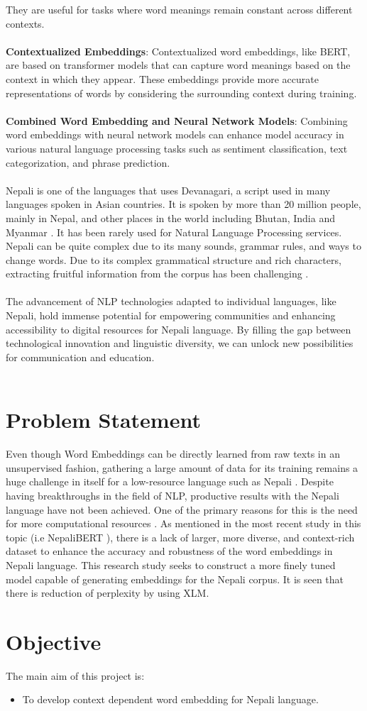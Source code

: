        They are useful for tasks where word meanings remain constant across different contexts.\\\\
        \textbf{Contextualized Embeddings}:
        Contextualized word embeddings, like BERT, are based on transformer models that can capture word meanings based on the context in which they appear.
        These embeddings provide more accurate representations of words by considering the surrounding context during training. \\\\
        \textbf{Combined Word Embedding and Neural Network Models}:
        Combining word embeddings with neural network models can enhance model accuracy in various natural language processing tasks such as sentiment classification, text categorization, and phrase prediction. \\\\
        Nepali is one of the languages that uses Devanagari, a script used in many languages spoken in Asian countries. It is spoken by more than 20 million people, mainly in Nepal, and other places in the world including Bhutan, India and Myanmar \cite{niraula2020linguistic}.  It has been rarely used for Natural Language Processing services.  Nepali can be quite complex due to its many sounds, grammar rules, and ways to change words. Due to its complex grammatical structure and rich characters, extracting fruitful information from the corpus has been challenging \cite{NepaliBERT}.\\\\
        The advancement of NLP technologies adapted to individual languages, like Nepali, hold immense potential for empowering communities and enhancing accessibility to digital resources for Nepali language. By filling the gap between technological innovation and linguistic diversity, we can unlock new possibilities for communication and education.\\\\
        \section{Problem Statement} 
        Even though Word Embeddings can be directly learned from raw texts in an unsupervised fashion, gathering a large amount of data for its training remains a huge challenge in itself for a low-resource language such as Nepali \cite{koirala-niraula-2021-npvec1}. Despite having breakthroughs in the field of NLP, productive results with the Nepali language have not been achieved. One of the primary reasons for this is the need for more computational resources \cite{NepaliBERT}. As mentioned in the most recent study in this topic (i.e NepaliBERT \cite{NepaliBERT}), there is a lack of larger, more diverse, and context-rich dataset to enhance the accuracy and robustness of the word embeddings in Nepali language. This research study seeks to construct a more finely tuned model capable of generating embeddings for the Nepali corpus. It is seen that there is reduction of perplexity by using XLM.
        \section{Objective}
            The main aim of this project is:
            \begin{itemize}
                \item To develop context dependent word embedding for Nepali language.
            \end{itemize}
